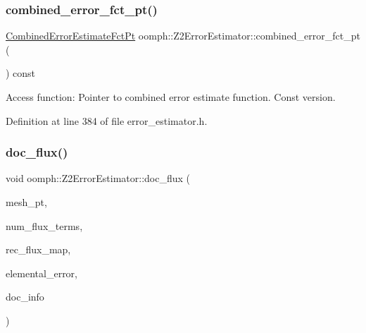 \mbox{\label{classoomph_1_1Z2ErrorEstimator_aa961268bfdb517d9a59a68eb159042c9}} 
\subsubsection{\texorpdfstring{combined\+\_\+error\+\_\+fct\+\_\+pt()}{combined\_error\_fct\_pt()}\hspace{0.1cm}{\footnotesize\ttfamily [2/2]}}
{\footnotesize\ttfamily \hyperlink{classoomph_1_1Z2ErrorEstimator_a75ef55e67b21ec49ed1a37d095cfa9f9}{Combined\+Error\+Estimate\+Fct\+Pt} oomph\+::\+Z2\+Error\+Estimator\+::combined\+\_\+error\+\_\+fct\+\_\+pt (\begin{DoxyParamCaption}{ }\end{DoxyParamCaption}) const\hspace{0.3cm}{\ttfamily [inline]}}



Access function\+: Pointer to combined error estimate function. Const version. 



Definition at line 384 of file error\+\_\+estimator.\+h.

\mbox{\label{classoomph_1_1Z2ErrorEstimator_ad84f3b903d0508093d6e2a905198b438}} 
\subsubsection{\texorpdfstring{doc\+\_\+flux()}{doc\_flux()}}
{\footnotesize\ttfamily void oomph\+::\+Z2\+Error\+Estimator\+::doc\+\_\+flux (\begin{DoxyParamCaption}\item[{\hyperlink{classoomph_1_1Mesh}{Mesh} $\ast$}]{mesh\+\_\+pt,  }\item[{const unsigned \&}]{num\+\_\+flux\+\_\+terms,  }\item[{\hyperlink{classoomph_1_1MapMatrixMixed}{Map\+Matrix\+Mixed}$<$ \hyperlink{classoomph_1_1Node}{Node} $\ast$, int, double $>$ \&}]{rec\+\_\+flux\+\_\+map,  }\item[{const \hyperlink{classoomph_1_1Vector}{Vector}$<$ double $>$ \&}]{elemental\+\_\+error,  }\item[{\hyperlink{classoomph_1_1DocInfo}{Doc\+Info} \&}]{doc\+\_\+info }\end{DoxyParamCaption})\hspace{0.3cm}{\ttfamily [private]}}



